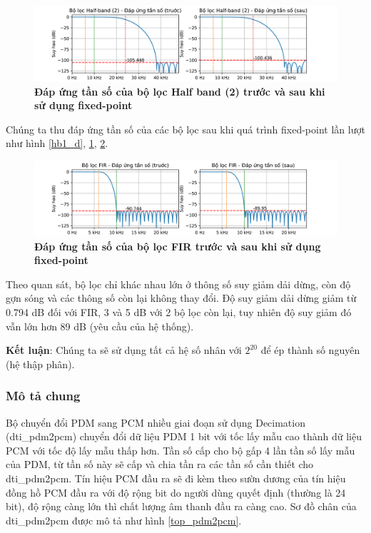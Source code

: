 \begin{figure}[H]
    \centering
    \includegraphics[width=17.5cm]{Images/Chuong4/hb2.png}
    \caption[Đáp ứng tần số của bộ lọc Half band (2) trước và sau khi sử dụng fixed-point]{\bfseries \fontsize{12pt}{0pt}\selectfont Đáp ứng tần số của bộ lọc Half band (2) trước và sau khi sử dụng fixed-point}
    \label{hb2_d}
\end{figure}
Chúng ta thu đáp ứng tần số của các bộ lọc sau khi quá trình fixed-point lần lượt như hình \ref{hb1_d}, \ref{hb2_d}, \ref{fir_d}.
\begin{figure}[H]
    \centering
    \includegraphics[width=17.5cm]{Images/Chuong4/fir.png}
    \caption[Đáp ứng tần số của bộ lọc FIR trước và sau khi sử dụng fixed-point]{\bfseries \fontsize{12pt}{0pt}\selectfont Đáp ứng tần số của bộ lọc FIR trước và sau khi sử dụng fixed-point}
    \label{fir_d}
\end{figure}



Theo quan sát, bộ lọc chỉ khác nhau lớn ở thông số suy giảm dải dừng, còn độ gợn sóng và các thông số còn lại không thay đổi. Độ suy giảm dải dừng giảm từ 0.794 dB đối với FIR, 3 và 5 dB với 2 bộ lọc còn lại, tuy nhiên độ suy giảm đó vẫn lớn hơn 89 dB (yêu cầu của hệ thống).

\textbf{Kết luận}: Chúng ta sẽ sử dụng tất cả hệ số nhân với $2^{20}$ để ép thành số nguyên (hệ thập phân).
\subsubsection{Mô tả chung}
Bộ chuyển đổi PDM sang PCM nhiều giai đoạn sử dụng Decimation (dti\_pdm2pcm) chuyển đổi dữ liệu PDM 1 bit với tốc lấy mẫu cao thành dữ liệu PCM với  tốc độ lấy mẫu thấp hơn. Tần số cấp cho bộ gấp 4 lần tần số lấy mẫu của PDM, từ tần số này sẽ cấp và chia tần ra các tần số cần thiết cho dti\_pdm2pcm. Tín hiệu PCM đầu ra sẽ đi kèm theo sườn dương của tín hiệu đồng hồ PCM đầu ra với độ rộng bit do người dùng quyết định (thường là 24 bit), độ rộng càng lớn thì chất lượng âm thanh đầu ra càng cao. Sơ đồ chân của dti\_pdm2pcm được mô tả như hình \ref{top_pdm2pcm}.

